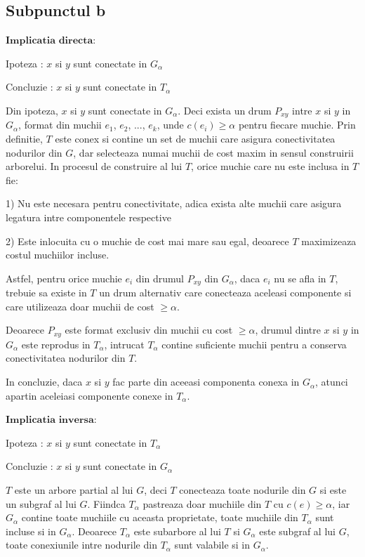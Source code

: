 \documentclass{article}
\begin{document}
{{\subsection*{\fontsize{16}{30}\selectfont Subpunctul b}
{\fontsize{14}{16}\selectfont 
$\mathbf{Implicatia}$ $\mathbf{directa:}$ 
\\
\par Ipoteza : $x$ si $y$ sunt conectate in $G_\alpha$
\par Concluzie : $x$ si $y$ sunt conectate in $T_\alpha$         
\\
\par Din ipoteza, $x$ si $y$ sunt conectate in $G_\alpha$. Deci exista un drum $P_{xy}$ intre $x$ si $y$ in $G_\alpha$, format din muchii $e_1$, $e_2$, ..., $e_k$, unde $c(e_i) \geq \alpha$ pentru fiecare muchie.
Prin definitie, $T$ este conex si contine un set de muchii care asigura conectivitatea nodurilor din $G$, dar selecteaza numai muchii de cost maxim in sensul construirii arborelui. In procesul de construire al lui $T$, orice muchie care nu este inclusa in $T$ fie:
\par 1) Nu este necesara pentru conectivitate, adica exista alte muchii care asigura legatura intre componentele respective
\par 2) Este inlocuita cu o muchie de cost mai mare sau egal, deoarece $T$ maximizeaza costul muchiilor incluse. 
\par Astfel, pentru orice muchie $e_i$ din drumul $P_{xy}$ din $G_\alpha$, daca $e_i$ nu se afla in $T$, trebuie sa existe in $T$ un drum alternativ care conecteaza aceleasi componente si care utilizeaza doar muchii de cost $\geq \alpha$.
\par Deoarece $P_{xy}$ este format exclusiv din muchii cu cost $\geq \alpha$, drumul dintre $x$ si $y$ in $G_\alpha$ este reprodus in $T_\alpha$, intrucat $T_\alpha$ contine suficiente muchii pentru a conserva conectivitatea nodurilor din $T$. 
\par In concluzie, daca $x$ si $y$ fac parte din aceeasi componenta conexa in $G_\alpha$, atunci apartin aceleiasi componente conexe in $T_\alpha$.    
\\
\par $\mathbf{Implicatia}$ $\mathbf{inversa:}$
\\
\par Ipoteza : $x$ si $y$ sunt conectate in $T_\alpha$
\par Concluzie : $x$ si $y$ sunt conectate in $G_\alpha$
\\
\par $T$ este un arbore partial al lui $G$, deci $T$ conecteaza toate nodurile din $G$ si este un subgraf al lui $G$. Fiindca $T_\alpha$ pastreaza doar muchiile din $T$ cu $c(e)\geq \alpha$, iar $G_\alpha$ contine toate muchiile cu aceasta proprietate, toate muchiile din $T_\alpha$ sunt incluse si in $G_\alpha$. Deoarece $T_\alpha$ este subarbore al lui $T$ si $G_\alpha$ este subgraf al lui $G$, toate conexiunile intre nodurile din $T_\alpha$ sunt valabile si in $G_\alpha$.
\\
}    

}}
\end{document}
